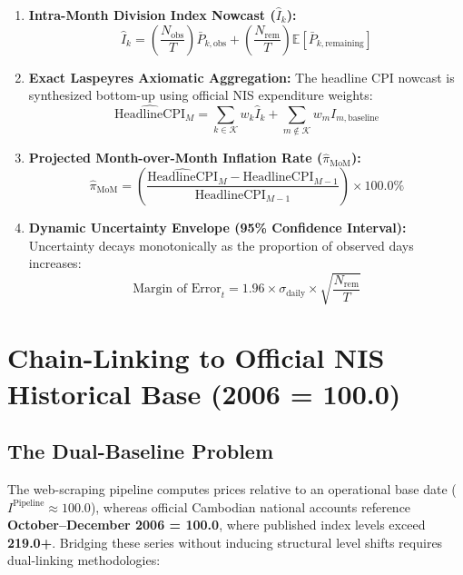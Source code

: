 \documentclass[11pt,a4paper]{article}
\begin{document}
\begin{enumerate}
\begin{equation}
        \end{equation}
    \item \textbf{Intra-Month Division Index Nowcast ($\hat{I}_k$):}
        \begin{equation}
        \hat{I}_k = \left( \frac{N_{\text{obs}}}{T} \right) \bar{P}_{k, \text{obs}} + \left( \frac{N_{\text{rem}}}{T} \right) \mathbb{E}[\bar{P}_{k, \text{remaining}}]
        \end{equation}
    \item \textbf{Exact Laspeyres Axiomatic Aggregation:}
        The headline CPI nowcast is synthesized bottom-up using official NIS expenditure weights:
        \begin{equation}
        \widehat{\text{HeadlineCPI}}_M = \sum_{k \in \mathcal{K}} w_k \hat{I}_k + \sum_{m \notin \mathcal{K}} w_m I_{m, \text{baseline}}
        \end{equation}
    \item \textbf{Projected Month-over-Month Inflation Rate ($\hat{\pi}_{\text{MoM}}$):}
        \begin{equation}
        \hat{\pi}_{\text{MoM}} = \left( \frac{\widehat{\text{HeadlineCPI}}_M - \text{HeadlineCPI}_{M-1}}{\text{HeadlineCPI}_{M-1}} \right) \times 100.0\%
        \end{equation}
    \item \textbf{Dynamic Uncertainty Envelope (95\% Confidence Interval):}
        Uncertainty decays monotonically as the proportion of observed days increases:
        \begin{equation}
        \text{Margin of Error}_t = 1.96 \times \sigma_{\text{daily}} \times \sqrt{\frac{N_{\text{rem}}}{T}}
        \end{equation}
\end{enumerate}

\newpage

\section{Chain-Linking to Official NIS Historical Base (2006 = 100.0)}

\subsection{The Dual-Baseline Problem}
The web-scraping pipeline computes prices relative to an operational base date ($I^{\text{Pipeline}} \approx 100.0$), whereas official Cambodian national accounts reference \textbf{October--December 2006 = 100.0}, where published index levels exceed \textbf{219.0+}. Bridging these series without inducing structural level shifts requires dual-linking methodologies:
\end{document}

